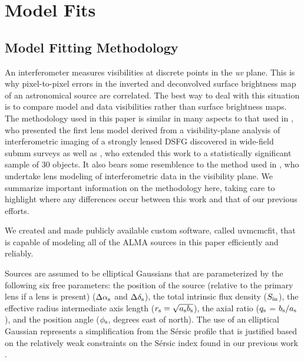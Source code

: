 \documentclass[iop]{emulateapj}
\begin{document}
\section{Model Fits}\label{sec:modelfits}

\subsection{Model Fitting Methodology}\label{sec:modelfitsmeth}

An interferometer measures visibilities at discrete points in the {\it uv}
plane.  This is why pixel-to-pixel errors in the inverted and deconvolved
surface brightness map of an astronomical source are correlated.  The best way
to deal with this situation is to compare model and data visibilities rather
than surface brightness maps.  The methodology used in this paper is similar in
many aspects to that used in \citet{Bussmann:2012lr}, who presented the first
lens model derived from a visibility-plane analysis of interferometric imaging
of a strongly lensed DSFG discovered in wide-field submm surveys as well as
\citet{Bussmann:2013lr}, who extended this work to a statistically significant
sample of 30 objects.  It also bears some resemblence to the method used in
\citet{Hezaveh:2013fk}, who undertake lens modeling of interferometric data in
the visibility plane.  We summarize important information on the methodology
here, taking care to highlight where any differences occur between this work and
that of our previous efforts.

We created and made publicly available custom software, called {\sc uvmcmcfit},
that is capable of modeling all of the ALMA sources in this paper efficiently
and reliably.  

Sources are assumed to be elliptical Gaussians that are parameterized by the
following six free parameters: the position of the source (relative to the
primary lens if a lens is present) ($\Delta \alpha_{\rm s}$ and $\Delta
\delta_{\rm s}$), the total intrinsic flux density ($S_{\rm in}$), the
effective radius intermediate axis length ($r_{\rm s} = \sqrt{a_{\rm s} b_{\rm
s}}$), the axial ratio ($q_{\rm s}$ =  $b_{\rm s}/a_{\rm s}$), and the position
angle ($\phi_{\rm s}$, degrees east of north).  The use of an elliptical
Gaussian represents a simplification from the S\'ersic profile
\citep{1968adga.book.....S}  that is justified based on the relatively weak
constraints on the S\'ersic index found in our previous work
\citep{Bussmann:2012lr, Bussmann:2013lr}.
\end{document}
